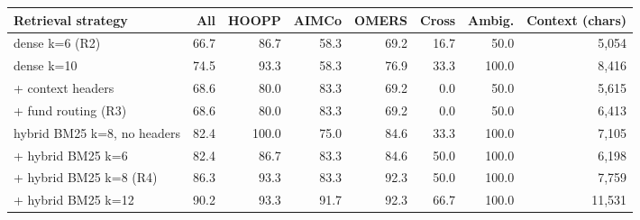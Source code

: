 \begin{tabular}{lrrrrrrr}
\toprule
Retrieval strategy & All & HOOPP & AIMCo & OMERS & Cross & Ambig. & Context (chars) \\
\midrule
dense k=6 (R2) & 66.7 & 86.7 & 58.3 & 69.2 & 16.7 & 50.0 & 5,054 \\
dense k=10 & 74.5 & 93.3 & 58.3 & 76.9 & 33.3 & 100.0 & 8,416 \\
+ context headers & 68.6 & 80.0 & 83.3 & 69.2 & 0.0 & 50.0 & 5,615 \\
+ fund routing (R3) & 68.6 & 80.0 & 83.3 & 69.2 & 0.0 & 50.0 & 6,413 \\
hybrid BM25 k=8, no headers & 82.4 & 100.0 & 75.0 & 84.6 & 33.3 & 100.0 & 7,105 \\
+ hybrid BM25 k=6 & 82.4 & 86.7 & 83.3 & 84.6 & 50.0 & 100.0 & 6,198 \\
+ hybrid BM25 k=8 (R4) & 86.3 & 93.3 & 83.3 & 92.3 & 50.0 & 100.0 & 7,759 \\
+ hybrid BM25 k=12 & 90.2 & 93.3 & 91.7 & 92.3 & 66.7 & 100.0 & 11,531 \\
\bottomrule
\end{tabular}
